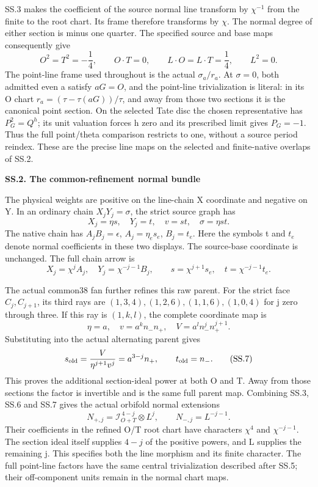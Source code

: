 SS.3 makes the coefficient of the source normal line
transform by \(\chi^{-1}\) from the finite to the root
chart. Its frame therefore transforms by \(\chi\).
The normal degree of either section is minus one quarter.
The specified source and base maps consequently give
\[
 O^2=T^2=-\frac14,\qquad O\cdot T=0,
 \qquad L\cdot O=L\cdot T=\frac14,\qquad L^2=0.
 \tag{SS.5}
\]
The point-line frame used throughout is the actual
\(\sigma_a/r_a\). At \(\sigma=0\), both admitted even
a satisfy \(aG=O\), and the point-line trivialization is
literal: in its O chart \(r_a=(\tau-\tau(aG))/\tau\),
and away from those two sections it is the canonical point
section. On the selected Tate disc the chosen representative
has \(P_G^2=Q^h\); its unit valuation forces h zero and
its prescribed limit gives \(P_G=-1\). Thus the full
point/theta comparison restricts to one, without a source
period reindex. These are the precise line maps on the
selected and finite-native overlaps of SS.2.

\par

\medskip\noindent\textbf{SS.2. The common-refinement normal bundle}

\par\nobreak

The physical weights are positive on the line-chain X
coordinate and negative on Y. In an ordinary chain
\(X_jY_j=\sigma\), the strict source graph has
\[
 X_j=\eta s,\quad Y_j=t,\quad v=st,
 \quad\sigma=\eta st.
\]
The native chain has \(A_jB_j=\epsilon\),
\(A_j=\eta_e s_e\), \(B_j=t_e\). Here the symbols
t and \(t_e\) denote normal coefficients in these
two displays. The source-base coordinate is unchanged.
The full chain arrow is
\[
 X_j=\chi^jA_j,\quad Y_j=\chi^{-j-1}B_j,
 \qquad s=\chi^{j+1}s_e,\quad t=\chi^{-j-1}t_e.
 \tag{SS.6}
\]

The actual common38 fan further refines this raw parent.
For the strict face \(C_j,C_{j+1}\), its third rays are
\((1,3,4),(1,2,6),(1,1,6),(1,0,4)\) for j zero
through three. If this ray is \((1,k,l)\), the
complete coordinate map is
\[
 \eta=a,\quad v=a^k n_-n_+,
 \quad V=a^l n_-^j n_+^{j+1}.
\]
Substituting into the actual alternating parent gives
\[
 s_{\rm old}=\frac{V}{\eta^{j+1}v^j}
             =a^{3-j}n_+,
 \qquad t_{\rm old}=n_-.
 \tag{SS.7}
\]
This proves the additional section-ideal power at both O
and T. Away from those sections the factor is invertible
and is the same full parent map. Combining SS.3, SS.6
and SS.7 gives the actual orbifold normal extensions
\[
 N_{+,j}=\mathcal I_{O+T}^{\,4-j}\otimes L^j,
 \qquad N_{-,j}=L^{-j-1}.
 \tag{SS.8}
\]
Their coefficients in the refined O/T root chart have
characters \(\chi^4\) and \(\chi^{-j-1}\).
The section ideal itself supplies \(4-j\) of the
positive powers, and L supplies the remaining j.
This specifies both the line morphism and its finite
character. The full point-line factors have the same
central trivialization described after SS.5; their
off-component units remain in the normal chart maps.


